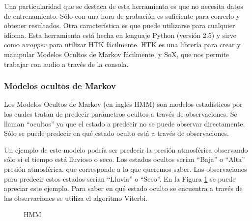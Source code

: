 
Una particularidad que se destaca de esta herramienta es que no necesita datos de entrenamiento. Sólo con una hora de grabación es suficiente para correrlo y obtener resultados. Otra característica es que puede utilizarse para cualquier idioma. Esta herramienta está hecha en lenguaje Python (versión 2.5) y sirve como $wrapper$ para utilizar HTK fácilmente. HTK es una librería para crear y manipular Modelos Ocultos de Markov fácilmente, y SoX, que nos permite trabajar con audio a través de la consola. 

\subsubsection*{Modelos ocultos de Markov}
Los Modelos Ocultos de Markov \cite{rabiner} (en ingles HMM) son modelos estadísticos por los cuales tratan de predecir parámetros ocultos a través de observaciones. Se llaman ``ocultos'' ya que el estado a predecir no se puede observar directamente. Sólo se puede predecir en qué estado oculto está a través de observaciones. 

Un ejemplo de este modelo podría ser predecir la presión atmosférica observando sólo si el tiempo está lluvioso o seco. Los estados ocultos serían ``Baja'' o ``Alta'' presión atmosférica, que corresponde a lo que queremos saber. Las observaciones para predecir estos estados serían ``Lluvia'' o ``Seco''. En la Figura \ref{ex_hmm} se puede apreciar este ejemplo. Para saber en qué estado oculto se encuentra a través de las observaciones se utiliza el algoritmo Viterbi.

\begin{figure}[htbp]
	\begin{center}
	\end{center}
	\caption{HMM}
	\label{ex_hmm}
\end{figure}

